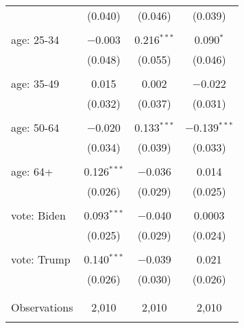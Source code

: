 \begin{tabular}{@{\extracolsep{5pt}}lccc}
  & (0.040) & (0.046) & (0.039) \\ 
  & & & \\ 
 age: 25-34 & $-$0.003 & 0.216$^{***}$ & 0.090$^{*}$ \\ 
  & (0.048) & (0.055) & (0.046) \\ 
  & & & \\ 
 age: 35-49 & 0.015 & 0.002 & $-$0.022 \\ 
  & (0.032) & (0.037) & (0.031) \\ 
  & & & \\ 
 age: 50-64 & $-$0.020 & 0.133$^{***}$ & $-$0.139$^{***}$ \\ 
  & (0.034) & (0.039) & (0.033) \\ 
  & & & \\ 
 age: 64+ & 0.126$^{***}$ & $-$0.036 & 0.014 \\ 
  & (0.026) & (0.029) & (0.025) \\ 
  & & & \\ 
 vote: Biden & 0.093$^{***}$ & $-$0.040 & 0.0003 \\ 
  & (0.025) & (0.029) & (0.024) \\ 
  & & & \\ 
 vote: Trump & 0.140$^{***}$ & $-$0.039 & 0.021 \\ 
  & (0.026) & (0.030) & (0.026) \\ 
  & & & \\ 
\hline \\[-1.8ex] 

Observations & 2,010 & 2,010 & 2,010 \\ 
\hline 
\hline \\[-1.8ex] 
\end{tabular} 